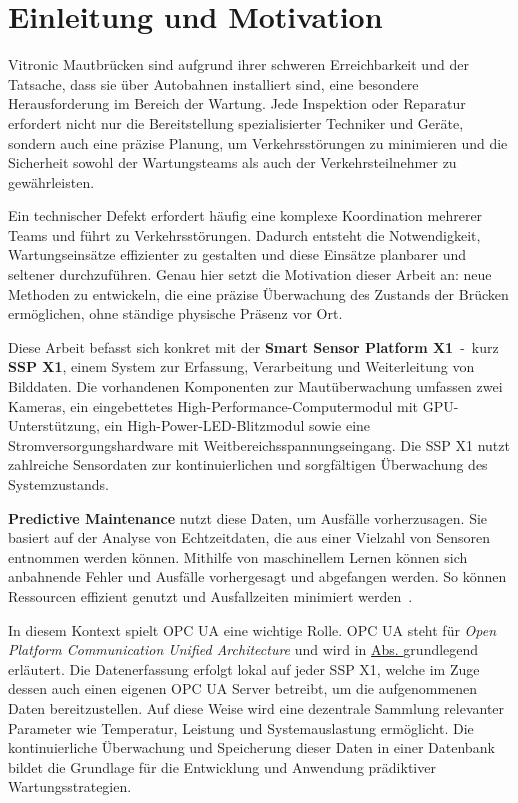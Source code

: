 \chapter{Einleitung und Motivation}
Vitronic Mautbrücken sind aufgrund ihrer schweren Erreichbarkeit und der Tatsache, dass sie über Autobahnen installiert
sind, eine besondere Herausforderung im Bereich der Wartung. Jede Inspektion oder Reparatur erfordert nicht nur die
Bereitstellung spezialisierter Techniker und Geräte, sondern auch eine präzise Planung, um Verkehrsstörungen zu
minimieren und die Sicherheit sowohl der Wartungsteams als auch der Verkehrsteilnehmer zu gewährleisten.

Ein technischer Defekt erfordert häufig eine komplexe Koordination mehrerer Teams und führt zu Verkehrsstörungen. Dadurch
entsteht die Notwendigkeit, Wartungseinsätze effizienter zu gestalten und diese
Einsätze planbarer und seltener durchzuführen. Genau hier setzt die Motivation dieser Arbeit an: neue Methoden zu entwickeln, die
eine präzise Überwachung des Zustands der Brücken ermöglichen, ohne ständige physische Präsenz vor Ort.

Diese Arbeit befasst sich konkret mit der \textbf{Smart Sensor Platform X1}~-~kurz \textbf{SSP X1}, einem System zur
Erfassung, Verarbeitung und Weiterleitung von Bilddaten. Die vorhandenen Komponenten zur Mautüberwachung umfassen zwei Kameras,
ein eingebettetes High-Performance-Computermodul mit GPU-Unterstützung, ein High-Power-LED-Blitzmodul sowie
eine Stromversorgungshardware mit Weitbereichsspannungseingang. Die SSP X1 nutzt zahlreiche Sensordaten zur
kontinuierlichen und sorgfältigen Überwachung des Systemzustands.

\textbf{Predictive Maintenance} nutzt diese Daten, um Ausfälle vorherzusagen. Sie basiert auf der Analyse
von Echtzeitdaten, die aus einer Vielzahl von Sensoren entnommen werden können. Mithilfe von maschinellem Lernen können
sich anbahnende Fehler und Ausfälle vorhergesagt und abgefangen werden. So können Ressourcen effizient
genutzt und Ausfallzeiten minimiert werden~\cite[S.~3]{Scheffer2004}.

In diesem Kontext spielt OPC UA eine wichtige Rolle. OPC UA steht für \textit{Open Platform Communication
Unified Architecture} und wird in \hyperref[sec:technologische_grundlagen]{Abs. } grundlegend erläutert.
Die Datenerfassung erfolgt lokal auf jeder SSP X1, welche im Zuge dessen auch einen eigenen OPC UA Server betreibt, um die aufgenommenen
Daten bereitzustellen. Auf diese Weise wird eine dezentrale Sammlung relevanter Parameter wie Temperatur,
Leistung und Systemauslastung ermöglicht. Die kontinuierliche Überwachung und Speicherung dieser Daten in einer Datenbank
bildet die Grundlage für die Entwicklung und Anwendung prädiktiver Wartungsstrategien.

